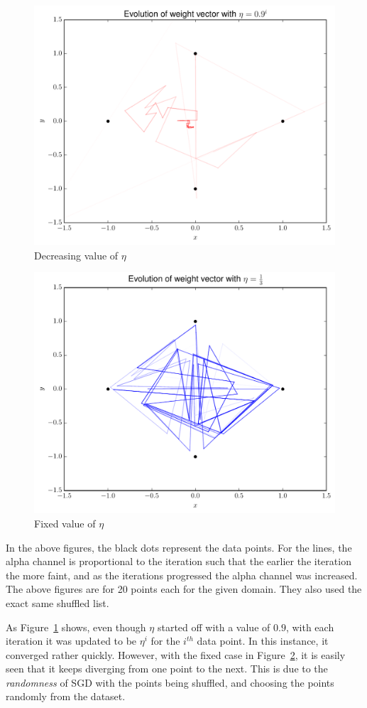 \documentclass[12pt]{article}
\begin{document}
\begin{enumerate}
\begin{enumerate}
\begin{figure}[H]
\centering
\includegraphics[width=.7\linewidth]{Decreasing.pdf}
\caption{Decreasing value of $\eta$}
\label{fig:dec}
\end{figure}


\begin{figure}[H]
\centering
\includegraphics[width=.7\linewidth]{Fixed.pdf}
\caption{Fixed value of $\eta$}
\label{fig:fix}
\end{figure}

In the above figures, the black dots represent the data points. For the lines, the alpha channel is proportional to the iteration such that the earlier the iteration the more faint, and as the iterations progressed the alpha channel was increased. The above figures are for 20 points each for the given domain. They also used the exact same shuffled list.

As Figure~\ref{fig:dec} shows, even though $\eta$ started off with a value of $0.9$, with each iteration it was updated to be $\eta^{i}$ for the $i^{th}$ data point. In this instance, it converged rather quickly. However, with the fixed case in Figure~\ref{fig:fix}, it is easily seen that it keeps diverging from one point to the next. This is due to the {\em randomness} of SGD with the points being shuffled, and choosing the points randomly from the dataset. 


\end{enumerate}
\end{enumerate}
\end{document}
